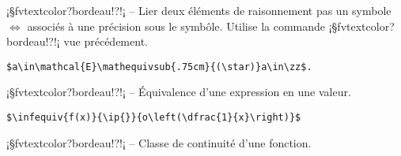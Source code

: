 \documentclass[11pt,a4paper,rgb]{report}
\begin{document}
\setlength{\leftskip}{0pt}
\setlength{\textwidth}{18cm}%


\vspace*{.75cm}

\inCodeStub¡§fvtextcolor?bordeau!?!¡ -- Lier deux éléments de raisonnement pas un symbole $\Longleftrightarrow$ associés à une précision sous le symbôle. Utilise la commande \inCodeStub¡§fvtextcolor?bordeau!?\mathspace!¡ vue précédement.

\setlength{\leftskip}{.75cm}%
\setlength{\textwidth}{17.25cm}%

\colorbox{blue!15}{}
\hfill
\begin{minipage}{.65\textwidth}
	\begin{lstlisting}[linewidth=\textwidth, language={[LaTeX]TeX}]
	$a\in\mathcal{E}\mathequivsub{.75cm}{(\star)}a\in\zz$.
	\end{lstlisting}
\end{minipage}

\setlength{\leftskip}{0pt}
\setlength{\textwidth}{18cm}%


\vspace*{.75cm}

\inCodeStub¡§fvtextcolor?bordeau!?!¡ -- Équivalence d'une expression en une valeur.

\setlength{\leftskip}{.75cm}%
\setlength{\textwidth}{17.25cm}%

\colorbox{blue!15}{}
\hfill
\begin{minipage}{.65\textwidth}
	\begin{lstlisting}[linewidth=\textwidth, language={[LaTeX]TeX}]
	$\infequiv{f(x)}{\ip{}}{o\left(\dfrac{1}{x}\right)}$
	\end{lstlisting}
\end{minipage}

\setlength{\leftskip}{0pt}
\setlength{\textwidth}{18cm}%


\vspace*{.75cm}

\inCodeStub¡§fvtextcolor?bordeau!?!¡ -- Classe de continuité d'une fonction.
\end{document}

